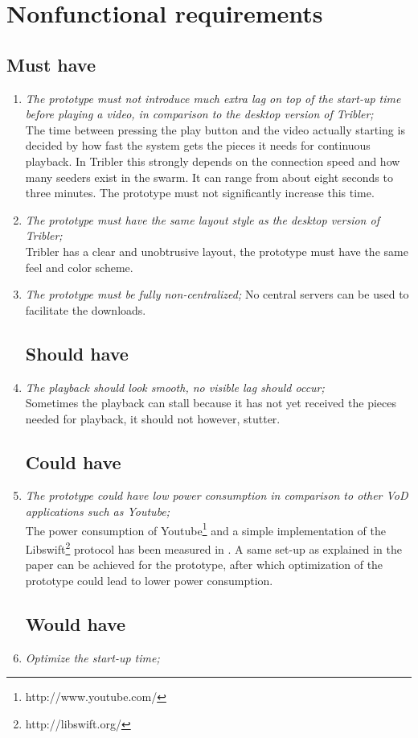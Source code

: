 \section{Nonfunctional requirements}

\subsection{Must have}
\begin{enumerate}
\item \emph{The prototype must not introduce much extra lag on top of the start-up time before playing a video, in comparison to the desktop version of Tribler;}\\
The time between pressing the play button and the video actually starting is decided by how fast the system gets the pieces it needs for continuous playback. In Tribler this strongly depends on the connection speed and how many seeders exist in the swarm. It can range from about eight seconds to three minutes. The prototype must not significantly increase this time.

\item \emph{The prototype must have the same layout style as the desktop version of Tribler;}\\
Tribler has a clear and unobtrusive layout, the prototype must have the same feel and color scheme.

\item \emph{The prototype must be fully non-centralized;}
No central servers can be used to facilitate the downloads.

\subsection{Should have}
\item \emph{The playback should look smooth, no visible lag should occur;}\\
Sometimes the playback can stall because it has not yet received the pieces needed for playback, it should not however, stutter.

\subsection{Could have}
\item \emph{The prototype could have low power consumption in comparison to other VoD applications such as Youtube;}\\
The power consumption of Youtube\footnote{http://www.youtube.com/} and a simple implementation of the Libswift\footnote{http://libswift.org/} protocol has been measured in \cite{libswift12}. A same set-up as explained in the paper can be achieved for the prototype, after which optimization of the prototype could lead to lower power consumption.

\subsection{Would have}
\item \emph{Optimize the start-up time;}

\end{enumerate}